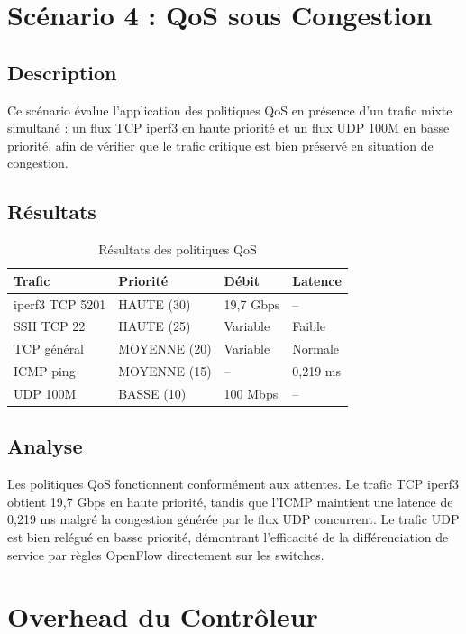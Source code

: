 \documentclass[12pt,a4paper]{report}
\begin{document}
\section{Scénario 4 : QoS sous Congestion}

\subsection{Description}
Ce scénario évalue l'application des politiques QoS en
présence d'un trafic mixte simultané : un flux TCP iperf3
en haute priorité et un flux UDP 100M en basse priorité,
afin de vérifier que le trafic critique est bien
préservé en situation de congestion.

\subsection{Résultats}

\begin{table}[H]
\centering
\caption{Résultats des politiques QoS}
\label{tab:scenario4}
\begin{tabular}{llll}
\toprule
\textbf{Trafic} & \textbf{Priorité} &
\textbf{Débit} & \textbf{Latence} \\
\midrule
iperf3 TCP 5201 & HAUTE (30) & 19,7 Gbps & -- \\
SSH TCP 22 & HAUTE (25) & Variable & Faible \\
TCP général & MOYENNE (20) & Variable & Normale \\
ICMP ping & MOYENNE (15) & -- & 0,219 ms \\
UDP 100M & BASSE (10) & 100 Mbps & -- \\
\bottomrule
\end{tabular}
\end{table}

\subsection{Analyse}
Les politiques QoS fonctionnent conformément aux
attentes. Le trafic TCP iperf3 obtient 19,7 Gbps en
haute priorité, tandis que l'ICMP maintient une latence
de 0,219 ms malgré la congestion générée par le flux
UDP concurrent. Le trafic UDP est bien relégué en basse
priorité, démontrant l'efficacité de la différenciation
de service par règles OpenFlow directement sur les switches.

\section{Overhead du Contrôleur}
\end{document}
